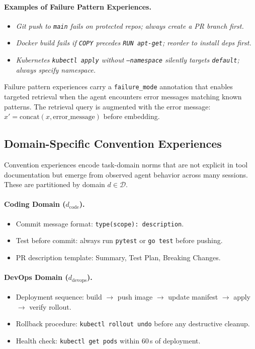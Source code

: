 \paragraph{Examples of Failure Pattern Experiences.}
\begin{itemize}[leftmargin=1.5em]
    \item \textit{Git push to \texttt{main} fails on protected repos; always
          create a PR branch first.}
    \item \textit{Docker build fails if \texttt{COPY} precedes \texttt{RUN
          apt-get}; reorder to install deps first.}
    \item \textit{Kubernetes \texttt{kubectl apply} without \texttt{--namespace}
          silently targets \texttt{default}; always specify namespace.}
\end{itemize}

Failure pattern experiences carry a \texttt{failure\_mode} annotation that
enables targeted retrieval when the agent encounters error messages matching
known patterns. The retrieval query is augmented with the error message:
$x' = \text{concat}(x, \text{error\_message})$ before embedding.

\subsection{Domain-Specific Convention Experiences}

Convention experiences encode task-domain norms that are not explicit in tool
documentation but emerge from observed agent behavior across many sessions.
These are partitioned by domain $d \in \mathcal{D}$.

\paragraph{Coding Domain ($d_{\text{code}}$).}
\begin{itemize}[leftmargin=1.5em]
    \item Commit message format: \texttt{type(scope): description}.
    \item Test before commit: always run \texttt{pytest} or \texttt{go test}
          before pushing.
    \item PR description template: Summary, Test Plan, Breaking Changes.
\end{itemize}

\paragraph{DevOps Domain ($d_{\text{devops}}$).}
\begin{itemize}[leftmargin=1.5em]
    \item Deployment sequence: build $\to$ push image $\to$ update manifest
          $\to$ apply $\to$ verify rollout.
    \item Rollback procedure: \texttt{kubectl rollout undo} before any
          destructive cleanup.
    \item Health check: \texttt{kubectl get pods} within 60\,s of deployment.
\end{itemize}

